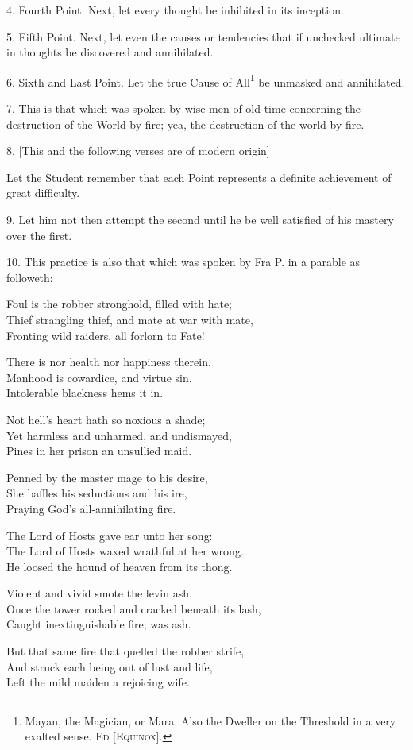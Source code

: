 4. Fourth Point. Next, let every thought be inhibited in its inception.

5. Fifth Point. Next, let even the causes or tendencies that if unchecked ultimate in thoughts be discovered and annihilated.

6. Sixth and Last Point. Let the true Cause of All\footnote{Mayan, the Magician, or Mara. Also the Dweller on the Threshold in a very exalted sense. \textsc{Ed [Equinox]}.} be unmasked and annihilated.

7. This is that which was spoken by wise men of old time concerning the destruction of the World by fire; yea, the destruction of the world by fire.

8. [This and the following verses are of modern origin]

Let the Student remember that each Point represents a definite achievement of great difficulty.

9. Let him not then attempt the second until he be well satisfied of his mastery over the first.

10. This practice is also that which was spoken by Fra P. in a parable as followeth: \begin{tightverse}
 Foul is the robber stronghold, filled with hate; \\
Thief strangling thief, and mate at war with mate, \\
Fronting wild raiders, all forlorn to Fate!

There is nor health nor happiness therein. \\
Manhood is cowardice, and virtue sin. \\
Intolerable blackness hems it in.

Not hell's heart hath so noxious a shade; \\
Yet harmless and unharmed, and undismayed, \\
Pines in her prison an unsullied maid.

Penned by the master mage to his desire, \\
She baffles his seductions and his ire, \\
Praying God's all-annihilating fire.

The Lord of Hosts gave ear unto her song: \\
The Lord of Hosts waxed wrathful at her wrong. \\
He loosed the hound of heaven from its thong.

Violent and vivid smote the levin ash. \\
Once the tower rocked and cracked beneath its lash, \\
Caught inextinguishable fire; was ash.

But that same fire that quelled the robber strife, \\
And struck each being out of lust and life, \\
Left the mild maiden a rejoicing wife.
\end{tightverse}


